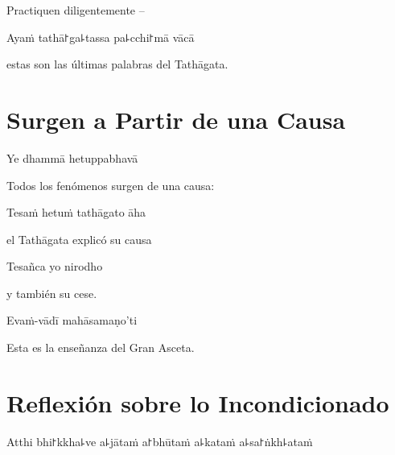 \begin{english}
  Practiquen diligentemente --
\end{english}

Ayaṁ tathā꜓ga꜕tassa pa꜕cchi꜓mā vācā

\begin{english}
  estas son las últimas palabras del Tathāgata.
\end{english}

\chapter{Surgen a Partir de una Causa}


\begin{leader}
\end{leader}

Ye dhammā hetuppabhavā

\begin{english}
  Todos los fenómenos surgen de una causa:
\end{english}

Tesaṁ hetuṁ tathāgato āha

\begin{english}
  el Tathāgata explicó su causa
\end{english}

Tesañca yo nirodho

\begin{english}
  y también su cese.
\end{english}

Evaṁ-vādī mahāsamaṇo'ti

\begin{english}
  Esta es la enseñanza del Gran Asceta.
\end{english}


\chapter[Incondicionado]{Reflexión sobre lo Incondicionado}


\begin{leader}
\end{leader}

Atthi bhi꜓kkha꜕ve a꜕jātaṁ a꜓bhūtaṁ a꜕kataṁ a꜕sa꜓ṅkh꜕ataṁ

